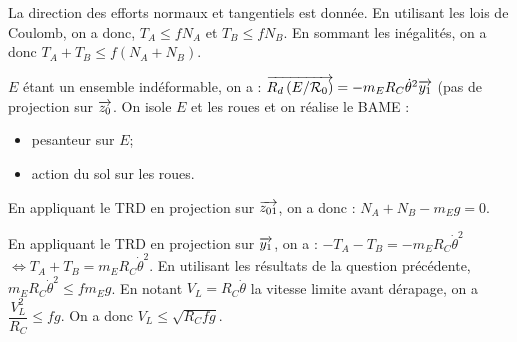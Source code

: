 \documentclass[10pt,fleqn]{article} %
\newif\ifnormal
\begin{document}
\begin{multicols}{2}
\ifnormal
\subparagraph{}\textit{Exprimer les conditions d'adhérence liant $T_A$, $T_B$, $N_A$, $N_B$ et $f$ traduisant le non glissement du véhicule. En déduire une inéquation liant $T_A + T_B$ à $f$ et $N_A + N_B$.}
\else
\fi

\ifprof
\begin{corrige}
La direction des efforts normaux et tangentiels est donnée. En utilisant les lois de Coulomb, on a donc, $T_A\leq fN_A$ et $T_B\leq fN_B$. En sommant les inégalités, on a donc $T_A+T_B\leq f\left(N_A+N_B\right)$.
\end{corrige}
\else
\fi

\ifnormal
\subparagraph{}\textit{Isoler $E$ et les roues. Écrire le théorème de la résultante dynamique en projection sur $\vect{z_0}$.}%
\else
\fi
\ifprof
\begin{corrige}
$E$ étant un ensemble indéformable, on a : $\overrightarrow{R_d \left( {E}/ {\mathcal{R}_{0}}\right)}=-m_E R_C\dot{\theta}^2\overrightarrow{y_1}$ (pas de projection sur $\vect{z_0}$. 
On isole $E$ et les roues  et on réalise le BAME : 
\begin{itemize}
\item pesanteur sur $E$;
\item action du sol sur les roues.
\end{itemize}

En appliquant le TRD en projection sur $\overrightarrow{z_{01}}$, on a donc :
$N_A+N_B-m_E g = 0$. 


\end{corrige}
\else
\fi

\ifnormal
\subparagraph{}\textit{Isoler $E$ et les roues. Écrire le théorème de la résultante dynamique en projection sur $\vect{y_1}$ . En déduire une inéquation donnant la vitesse limite $V_L$ de passage dans un virage qui ne provoque pas le dérapage.}
\else
\fi

\ifprof

\begin{corrige}
En appliquant le TRD en projection sur $\overrightarrow{y_{1}}$, on a : $-T_A-T_B = -m_E R_C\dot{\theta}^2$ $\Leftrightarrow T_A+T_B = m_E R_C\dot{\theta}^2$. En utilisant les résultats de la question précédente, $m_E R_C\dot{\theta}^2 \leq fm_E g $. En notant $V_L=R_C\dot{\theta}$ la vitesse limite avant dérapage, on a $ \dfrac{V_L^2}{R_C} \leq f  g $.
On a donc $V_L \leq \sqrt{R_Cfg}$.
\end{corrige}
\else
\fi


\end{multicols}
\end{document}
